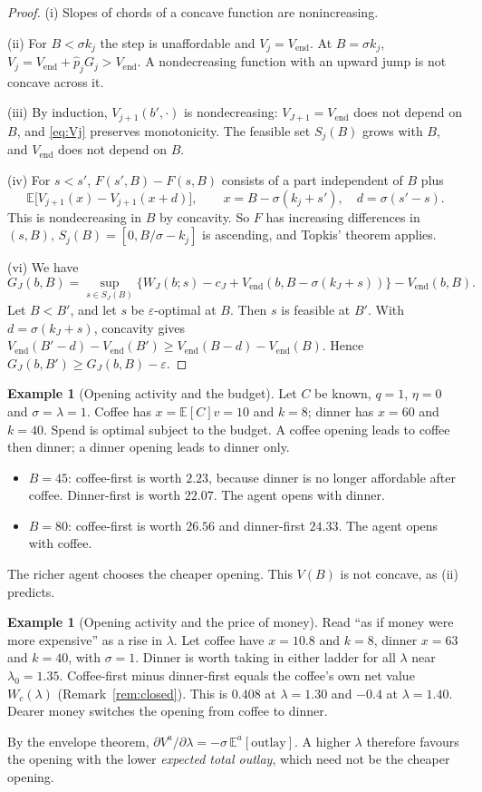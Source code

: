 \documentclass[11pt,a4paper]{article}
\theoremstyle{definition}
\newtheorem{example}[theorem]{Example}
\theoremstyle{remark}
\newcommand{\E}{\mathbb{E}}
\newcommand{\Vend}{V_{\mathrm{end}}}
\newcommand{\pp}{\hat p}
\begin{document}
\begin{proof}
(i) Slopes of chords of a concave function are nonincreasing.

(ii) For $B<\sigma k_j$ the step is unaffordable and $V_j=\Vend$. At $B=\sigma k_j$, $V_j=\Vend+\pp_jG_j>\Vend$. A nondecreasing function with an upward jump is not concave across it.

(iii) By induction, $V_{j+1}(b',\cdot)$ is nondecreasing: $V_{J+1}=\Vend$ does not depend on $B$, and \eqref{eq:Vj} preserves monotonicity. The feasible set $S_j(B)$ grows with $B$, and $\Vend$ does not depend on $B$.

(iv) For $s<s'$, $F(s',B)-F(s,B)$ consists of a part independent of $B$ plus
\[
\E\bigl[V_{j+1}(x)-V_{j+1}(x+d)\bigr],\qquad x=B-\sigma(k_j+s'),\quad d=\sigma(s'-s).
\]
This is nondecreasing in $B$ by concavity. So $F$ has increasing differences in $(s,B)$, $S_j(B)=[0,B/\sigma-k_j]$ is ascending, and Topkis' theorem \cite{topkis} applies.

(vi) We have
\[
G_J(b,B)=\sup_{s\in S_J(B)}\bigl\{W_J(b;s)-c_J+\Vend(b,B-\sigma(k_J+s))\bigr\}-\Vend(b,B).
\]
Let $B<B'$, and let $s$ be $\varepsilon$-optimal at $B$. Then $s$ is feasible at $B'$. With $d=\sigma(k_J+s)$, concavity gives $\Vend(B'-d)-\Vend(B')\ge\Vend(B-d)-\Vend(B)$. Hence $G_J(b,B')\ge G_J(b,B)-\varepsilon$.
\end{proof}

\begin{example}[Opening activity and the budget]\label{ex:openB}
Let $C$ be known, $q=1$, $\eta=0$ and $\sigma=\lambda=1$. Coffee has $x=\E[C]v=10$ and $k=8$; dinner has $x=60$ and $k=40$. Spend is optimal subject to the budget. A coffee opening leads to coffee then dinner; a dinner opening leads to dinner only.
\begin{itemize}[nosep]
\item $B=45$: coffee-first is worth $2.23$, because dinner is no longer affordable after coffee. Dinner-first is worth $22.07$. The agent opens with dinner.
\item $B=80$: coffee-first is worth $26.56$ and dinner-first $24.33$. The agent opens with coffee.
\end{itemize}
The richer agent chooses the cheaper opening. This $V(B)$ is not concave, as (ii) predicts.
\end{example}

\begin{example}[Opening activity and the price of money]\label{ex:openL}
Read ``as if money were more expensive'' as a rise in $\lambda$. Let coffee have $x=10.8$ and $k=8$, dinner $x=63$ and $k=40$, with $\sigma=1$. Dinner is worth taking in either ladder for all $\lambda$ near $\lambda_0=1.35$. Coffee-first minus dinner-first equals the coffee's own net value $W_c(\lambda)$ (Remark~\ref{rem:closed}). This is $0.408$ at $\lambda=1.30$ and $-0.4$ at $\lambda=1.40$. Dearer money switches the opening from coffee to dinner.

By the envelope theorem, $\partial V^{a}/\partial\lambda=-\sigma\,\E^{a}[\text{outlay}]$. A higher $\lambda$ therefore favours the opening with the lower \emph{expected total outlay}, which need not be the cheaper opening.
\end{example}
\end{document}
